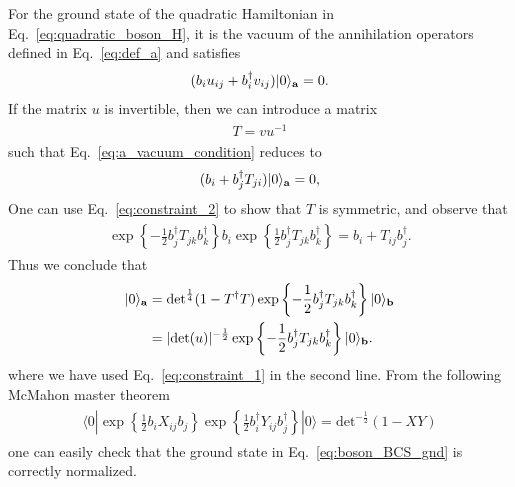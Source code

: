 For the ground state of the quadratic Hamiltonian in Eq.~\eqref{eq:quadratic_boson_H}, it is the vacuum of the annihilation operators defined in Eq.~\eqref{eq:def_a} and satisfies
\begin{eqnarray}\begin{aligned}
\label{eq:a_vacuum_condition}
(b_iu_{ij}+b_i^\dagger v_{ij})|0\rangle_{{\bf a}}=0.
\end{aligned}\end{eqnarray}
If the matrix $u$ is invertible, then we can introduce a matrix
\begin{eqnarray}\begin{aligned}
T=vu^{-1}
\end{aligned}\end{eqnarray}
such that Eq.~\eqref{eq:a_vacuum_condition} reduces to
\begin{eqnarray}\begin{aligned}
(b_i+b_j^\dagger T_{ji})|0\rangle_{{\bf a}}=0,
\end{aligned}\end{eqnarray}
One can use Eq.~\eqref{eq:constraint_2} to show that $T$ is symmetric, and observe that
\begin{eqnarray}\begin{aligned}
\exp\left\{-\frac{1}{2}b_j^\dagger T_{jk}b_k^\dagger\right\}b_i\exp\left\{\frac{1}{2}b_j^\dagger T_{jk}b_k^\dagger\right\}=b_i+T_{ij}b^\dagger_j.
\end{aligned}\end{eqnarray}
Thus we conclude that 
\begin{eqnarray}\begin{aligned}
\label{eq:boson_BCS_gnd}
|0\rangle_{{\bf a}}&=\text{det}^{\frac{1}{4}}(1-T^\dagger T)\exp\left\{-\frac{1}{2}b_j^\dagger T_{jk}b_k^\dagger\right\}|0\rangle_{\bf b}\\
&=|\text{det}(u)|^{-\frac{1}{2}}\exp\left\{-\frac{1}{2}b_j^\dagger T_{jk}b_k^\dagger\right\}|0\rangle_{\bf b}.
\end{aligned}\end{eqnarray}
where we have used Eq.~\eqref{eq:constraint_1} in the second line. From the following McMahon master theorem
\begin{eqnarray}\begin{aligned}
\label{eq:bosonic_McMahon}
\langle0|\exp\left\{\frac{1}{2}b_iX_{ij}b_j\right\}\exp\left\{\frac{1}{2}b^\dagger_iY_{ij}b^\dagger_j\right\}|0\rangle=\text{det}^{-\frac{1}{2}}(1-XY)
\end{aligned}\end{eqnarray}
one can easily check that the ground state in Eq.~\eqref{eq:boson_BCS_gnd} is correctly normalized. 

